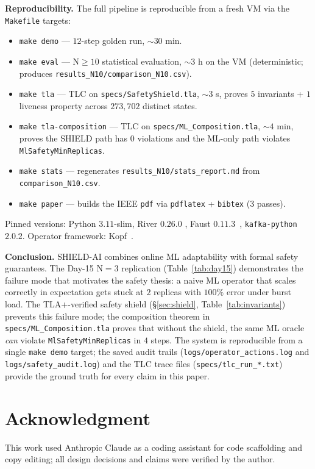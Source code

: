 \documentclass[conference,10pt]{IEEEtran}
\begin{document}
\textbf{Reproducibility.} \label{sec:reproduce}
The full pipeline is reproducible from a fresh VM via the
\texttt{Makefile} targets:
\begin{itemize}
    \item \texttt{make demo} --- $12$-step golden run, $\sim 30$ min.
    \item \texttt{make eval} --- N$\geq 10$ statistical evaluation,
          $\sim 3$ h on the VM (deterministic; produces
          \texttt{results\_N10/comparison\_N10.csv}).
    \item \texttt{make tla} --- TLC on \texttt{specs/SafetyShield.tla},
          $\sim 3$ s, proves $5$ invariants + $1$ liveness property
          across $273{,}702$ distinct states.
    \item \texttt{make tla-composition} --- TLC on
          \texttt{specs/ML\_Composition.tla}, $\sim 4$ min, proves the
          SHIELD path has $0$ violations and the ML-only path violates
          \texttt{MlSafetyMinReplicas}.
    \item \texttt{make stats} --- regenerates
          \texttt{results\_N10/stats\_report.md} from
          \texttt{comparison\_N10.csv}.
    \item \texttt{make paper} --- builds the IEEE \texttt{pdf} via
          \texttt{pdflatex} + \texttt{bibtex} ($3$ passes).
\end{itemize}
Pinned versions: Python $3.11$-slim, River $0.26.0$
\cite{river_jmlr_2020}, Faust $0.11.3$~\cite{faust_doc},
\texttt{kafka-python} $2.0.2$. Operator framework:
Kopf~\cite{kopf_doc}.

\textbf{Conclusion.} SHIELD-AI combines online ML adaptability with
formal safety guarantees. The Day-15 N$=3$ replication
(Table~\ref{tab:day15}) demonstrates the failure mode that motivates
the safety thesis: a naive ML operator that scales correctly in
expectation gets stuck at $2$ replicas with $100\%$ error under burst
load. The TLA+-verified safety shield
(§\ref{sec:shield}, Table~\ref{tab:invariants}) prevents this
failure mode; the composition theorem in
\texttt{specs/ML\_Composition.tla} proves that without the shield,
the same ML oracle \emph{can} violate \texttt{MlSafetyMinReplicas}
in $4$ steps. The system is reproducible from a single
\texttt{make demo} target; the saved audit trails
(\texttt{logs/operator\_actions.log} and \texttt{logs/safety\_audit.log})
and the TLC trace files (\texttt{specs/tlc\_run\_*.txt}) provide the
ground truth for every claim in this paper.

\section*{Acknowledgment}

This work used Anthropic Claude as a coding assistant for code
scaffolding and copy editing; all design decisions and claims were
verified by the author.



%
\end{document}
